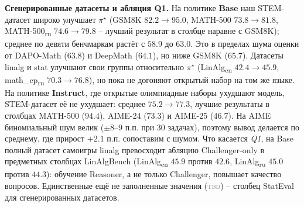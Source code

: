 \documentclass{article}
\newcommand{\tbd}{\textcolor{gray}{\textsc{tbd}}}
\begin{document}
\textbf{Сгенерированные датасеты и абляция Q1.}
На политике \textbf{Base} наш STEM-датасет широко улучшает $\pi^\star$ (GSM8K $82.2\!\to\!95.0$, MATH-500 $73.8\!\to\!81.8$, MATH-500\textsubscript{ru} $74.6\!\to\!79.8$ -- лучший результат в столбце наравне с GSM8K); среднее по девяти бенчмаркам растёт с $58.9$ до $63.0$. Это в пределах шума оценки от DAPO-Math ($63.8$) и DeepMath ($64.1$), но ниже GSM8K ($65.7$). Датасеты linalg и stat улучшают свои группы относительно $\pi^\star$ (LinAlg\textsubscript{en} $42.4\!\to\!45.9$, math\_cp\textsubscript{ru} $70.3\!\to\!76.8$), но пока не догоняют открытый набор на том же языке. На политике \textbf{Instruct}, где открытые олимпиадные наборы ухудшают модель, STEM-датасет её не ухудшает: среднее $75.2\!\to\!77.3$, лучшие результаты в столбцах MATH-500 ($94.4$), AIME-24 ($73.3$) и AIME-25 ($46.7$). На AIME биномиальный шум велик ($\pm8$--$9$ п.п. при $30$ задачах), поэтому вывод делается по среднему, где прирост $+2.1$ п.п. сопоставим с шумом. Что касается \emph{Q1}, на Base полный датасет самоигры linalg превосходит абляцию Challenger-only в предметных столбцах LinAlgBench (LinAlg\textsubscript{en} $45.9$ против $42.6$, LinAlg\textsubscript{ru} $45.0$ против $44.3$): обучение Reasoner, а не только Challenger, повышает качество вопросов. Единственные ещё не заполненные значения (\tbd) -- столбец StatEval для сгенерированных датасетов.
\end{document}
